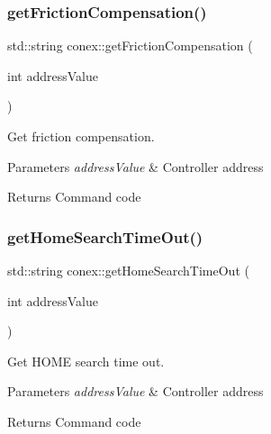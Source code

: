 \subsubsection{\texorpdfstring{get\+Friction\+Compensation()}{getFrictionCompensation()}}
{\footnotesize\ttfamily std\+::string conex\+::get\+Friction\+Compensation (\begin{DoxyParamCaption}\item[{int}]{address\+Value }\end{DoxyParamCaption})}



Get friction compensation. 


\begin{DoxyParams}{Parameters}
{\em address\+Value} & Controller address \\
\hline
\end{DoxyParams}
\begin{DoxyReturn}{Returns}
Command code 
\end{DoxyReturn}
\mbox{\label{namespaceconex_a5652c22cdfb236799111449461eb88f5}} 
\subsubsection{\texorpdfstring{get\+Home\+Search\+Time\+Out()}{getHomeSearchTimeOut()}}
{\footnotesize\ttfamily std\+::string conex\+::get\+Home\+Search\+Time\+Out (\begin{DoxyParamCaption}\item[{int}]{address\+Value }\end{DoxyParamCaption})}



Get H\+O\+ME search time out. 


\begin{DoxyParams}{Parameters}
{\em address\+Value} & Controller address \\
\hline
\end{DoxyParams}
\begin{DoxyReturn}{Returns}
Command code 
\end{DoxyReturn}
\mbox{\label{namespaceconex_ad1b0c2c8ee173f299589772d4c2fd3b2}} 
